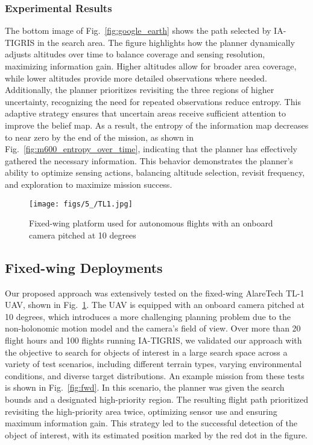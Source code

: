 \subsubsection{Experimental Results}


The bottom image of Fig.~\ref{fig:google_earth} shows the path selected by IA-TIGRIS in the search area. The figure highlights how the planner dynamically adjusts altitudes over time to balance coverage and sensing resolution, maximizing information gain. Higher altitudes allow for broader area coverage, while lower altitudes provide more detailed observations where needed. Additionally, the planner prioritizes revisiting the three regions of higher uncertainty, recognizing the need for repeated observations reduce entropy. This adaptive strategy ensures that uncertain areas receive sufficient attention to improve the belief map. As a result, the entropy of the information map decreases to near zero by the end of the mission, as shown in Fig.~\ref{fig:m600_entropy_over_time}, indicating that the planner has effectively gathered the necessary information. This behavior demonstrates the planner’s ability to optimize sensing actions, balancing altitude selection, revisit frequency, and exploration to maximize mission success.

\begin{figure}[t]
\centering
\texttt{[image: figs/5\_/TL1.jpg]}
\caption{Fixed-wing platform used for autonomous flights with an onboard camera pitched at 10 degrees\cite{alarewebsite}}
\label{fig:tl1}
\end{figure}






\subsection{Fixed-wing Deployments}

Our proposed approach was extensively tested on the fixed-wing AlareTech TL-1 UAV, shown in Fig.~\ref{fig:tl1}. The UAV is equipped with an onboard camera pitched at 10 degrees, which introduces a more challenging planning problem due to the non-holonomic motion model and the camera's field of view. Over more than 20 flight hours and 100 flights running IA-TIGRIS, we validated our approach with the objective to search for objects of interest in a large search space across a variety of test scenarios, including different terrain types, varying environmental conditions, and diverse target distributions. An example mission from these tests is shown in Fig.~\ref{fig:fwd}. In this scenario, the planner was given the search bounds and a designated high-priority region. The resulting flight path prioritized revisiting the high-priority area twice, optimizing sensor use and ensuring maximum information gain. This strategy led to the successful detection of the object of interest, with its estimated position marked by the red dot in the figure. 

